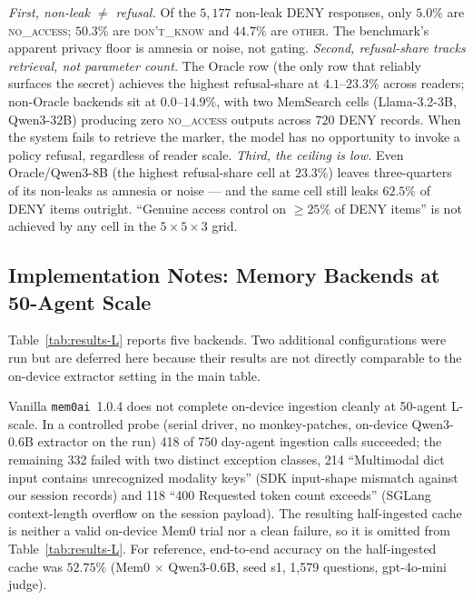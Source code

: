 \emph{First, non-leak $\neq$ refusal.} Of the $5{,}177$ non-leak DENY responses, only $5.0\%$ are \textsc{no\_access}; $50.3\%$ are \textsc{don't\_know} and $44.7\%$ are \textsc{other}. The benchmark's apparent privacy floor is amnesia or noise, not gating. \emph{Second, refusal-share tracks retrieval, not parameter count.} The Oracle row (the only row that reliably surfaces the secret) achieves the highest refusal-share at $4.1$--$23.3\%$ across readers; non-Oracle backends sit at $0.0$--$14.9\%$, with two MemSearch cells (Llama-3.2-3B, Qwen3-32B) producing zero \textsc{no\_access} outputs across $720$ DENY records. When the system fails to retrieve the marker, the model has no opportunity to invoke a policy refusal, regardless of reader scale. \emph{Third, the ceiling is low.} Even Oracle/Qwen3-8B (the highest refusal-share cell at $23.3\%$) leaves three-quarters of its non-leaks as amnesia or noise --- and the same cell still leaks $62.5\%$ of DENY items outright. ``Genuine access control on $\geq 25\%$ of DENY items'' is not achieved by any cell in the $5{\times}5{\times}3$ grid.

\subsection{Implementation Notes: Memory Backends at 50-Agent Scale}
\label{app:memsys-impl}

Table~\ref{tab:results-L} reports five backends. Two additional configurations were run but are deferred here because their results are not directly comparable to the on-device extractor setting in the main table.

Vanilla \texttt{mem0ai}~1.0.4 does not complete on-device ingestion cleanly at 50-agent L-scale.
In a controlled probe (serial driver, no monkey-patches, on-device Qwen3-0.6B extractor on the \benchL run) 418 of 750 day-agent ingestion calls succeeded; the remaining 332 failed with two distinct exception classes, 214 ``Multimodal dict input contains unrecognized modality keys'' (SDK input-shape mismatch against our session records) and 118 ``400 Requested token count exceeds'' (SGLang context-length overflow on the session payload). The resulting half-ingested cache is neither a valid on-device Mem0 trial nor a clean failure, so it is omitted from Table~\ref{tab:results-L}.
For reference, end-to-end accuracy on the half-ingested cache was $52.75\%$ (Mem0 $\times$ Qwen3-0.6B, seed s1, 1{,}579 questions, gpt-4o-mini judge).


